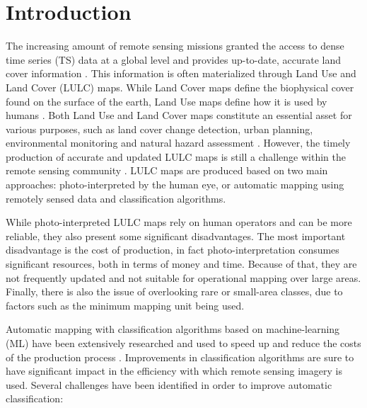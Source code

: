 \section{Introduction}

The increasing amount of remote sensing missions granted the access to dense
time series (TS) data at a global level and provides up-to-date, accurate land
cover information \cite{Drusch2012}. This information is often materialized
through Land Use and Land Cover (LULC) maps. While Land Cover maps
define the biophysical cover found on the surface of the earth, Land Use maps
define how it is used by humans \cite{Fritz2017}. Both Land Use and Land Cover
maps constitute an essential asset for various purposes, such as land cover
change detection, urban planning, environmental monitoring and natural hazard
assessment \cite{Khatami2016}. However, the timely production of accurate and
updated LULC maps is still a challenge within the remote sensing community
\cite{Wulder2018}. LULC maps are produced based on two main approaches:
photo-interpreted by the human eye, or automatic mapping using remotely sensed
data and classification algorithms.

While photo-interpreted LULC maps rely on human operators and can be more
reliable, they also present some significant disadvantages. The most important
disadvantage is the cost of production, in fact photo-interpretation consumes
significant resources, both in terms of money and time. Because of that, they
are not frequently updated and not suitable for operational mapping over large
areas.  Finally, there is also the issue of overlooking rare or small-area
classes, due to factors such as the minimum mapping unit being used.

Automatic mapping with classification algorithms based on machine-learning
(ML) have been extensively researched and used to speed up and reduce the
costs of the production process \cite{Khatami2016, Gavade2019,
Kaur2019}. Improvements in classification algorithms are sure to have
significant impact in the efficiency with which remote sensing imagery is
used. Several challenges have been identified in order to improve automatic
classification:

